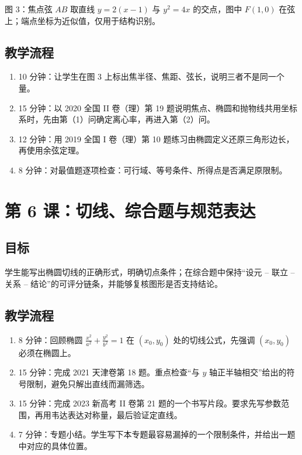 \documentclass[UTF8,a4paper,11pt]{ctexart}
\newcommand{\lesson}[1]{\section{#1}}
\begin{document}
\begin{center}
\end{center}
\noindent\small 图 3：焦点弦 $AB$ 取直线 $y=2(x-1)$ 与 $y^2=4x$ 的交点，图中 $F(1,0)$ 在弦上；端点坐标为近似值，仅用于结构识别。\normalsize

\subsection*{教学流程}
\begin{enumerate}
  \item 10 分钟：让学生在图 3 上标出焦半径、焦距、弦长，说明三者不是同一个量。
  \item 15 分钟：以 2020 全国 II 卷（理）第 19 题说明焦点、椭圆和抛物线共用坐标系时，先由第（1）问确定离心率，再进入第（2）问。
  \item 12 分钟：用 2019 全国 I 卷（理）第 10 题练习由椭圆定义还原三角形边长，再使用余弦定理。
  \item 8 分钟：对最值题逐项检查：可行域、等号条件、所得点是否满足原限制。
\end{enumerate}

\lesson{第 6 课：切线、综合题与规范表达}
\subsection*{目标}
学生能写出椭圆切线的正确形式，明确切点条件；在综合题中保持“设元 -- 联立 -- 关系 -- 结论”的可评分链条，并能够复核图形是否支持结论。

\subsection*{教学流程}
\begin{enumerate}
  \item 8 分钟：回顾椭圆 $\frac{x^2}{a^2}+\frac{y^2}{b^2}=1$ 在 $(x_0,y_0)$ 处的切线公式，先强调 $(x_0,y_0)$ 必须在椭圆上。
  \item 15 分钟：完成 2021 天津卷第 18 题。重点检查“与 $y$ 轴正半轴相交”给出的符号限制，避免只解出直线而漏筛选。
  \item 15 分钟：完成 2023 新高考 II 卷第 21 题的一个书写片段。要求先写参数范围，再用韦达表达对称量，最后验证定直线。
  \item 7 分钟：专题小结。学生写下本专题最容易漏掉的一个限制条件，并给出一题中对应的具体位置。
\end{enumerate}
\end{document}
